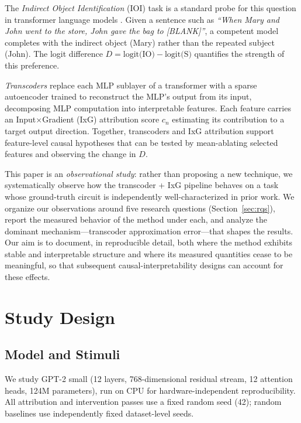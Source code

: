 \documentclass{article}
\begin{document}
The \emph{Indirect Object Identification} (IOI) task is a standard probe for
this question in transformer language models
\citep{wang2022interpretability}. Given a sentence such as \emph{``When Mary
and John went to the store, John gave the bag to [BLANK]''}, a competent model
completes with the indirect object (Mary) rather than the repeated subject
(John). The logit difference $D = \text{logit(IO)} - \text{logit(S)}$
quantifies the strength of this preference.

\emph{Transcoders} \citep{dunefsky2024transcoders} replace each MLP sublayer of
a transformer with a sparse autoencoder trained to reconstruct the MLP's output
from its input, decomposing MLP computation into interpretable features. Each
feature carries an Input$\times$Gradient (IxG) attribution score $c_n$
estimating its contribution to a target output direction. Together, transcoders
and IxG attribution support feature-level causal hypotheses that can be tested
by mean-ablating selected features and observing the change in $D$.

This paper is an \emph{observational study}: rather than proposing a new
technique, we systematically observe how the transcoder + IxG pipeline behaves
on a task whose ground-truth circuit is independently well-characterized in
prior work. We organize our observations around five research questions
(Section~\ref{sec:rqs}), report the measured behavior of the method under each,
and analyze the dominant mechanism---transcoder approximation error---that
shapes the results. Our aim is to document, in reproducible detail, both where
the method exhibits stable and interpretable structure and where its measured
quantities cease to be meaningful, so that subsequent causal-interpretability
designs can account for these effects.

\section{Study Design}

\subsection{Model and Stimuli}

We study GPT-2 small (12 layers, 768-dimensional residual stream, 12 attention
heads, 124M parameters), run on CPU for hardware-independent reproducibility.
All attribution and intervention passes use a fixed random seed (42); random
baselines use independently fixed dataset-level seeds.
\end{document}
